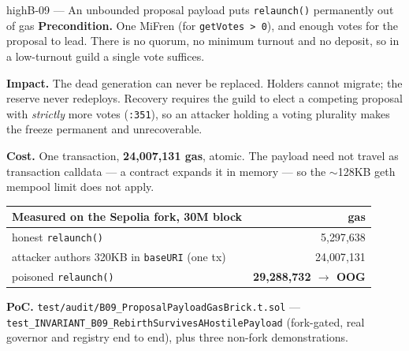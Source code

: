 \documentclass[11pt,a4paper]{article}
\newcommand{\code}[1]{\texttt{\small #1}}
\newcommand{\fileref}[1]{\texttt{\scriptsize #1}}
\begin{document}
\begin{findingbox}{high}{B-09 --- An unbounded proposal payload puts \code{relaunch()} permanently out of gas}
\textbf{Precondition.} One MiFren (for \code{getVotes > 0}), and enough votes for the
proposal to lead. There is no quorum, no minimum turnout and no deposit, so in a
low-turnout guild a single vote suffices.

\textbf{Impact.} The dead generation can never be replaced. Holders cannot migrate; the
reserve never redeploys. Recovery requires the guild to elect a competing proposal with
\emph{strictly} more votes (\fileref{:351}), so an attacker holding a voting plurality
makes the freeze permanent and unrecoverable.

\textbf{Cost.} One transaction, \textbf{24{,}007{,}131 gas}, atomic. The payload need not
travel as transaction calldata --- a contract expands it in memory --- so the $\sim$128KB
geth mempool limit does not apply.

\medskip
\begin{center}
\begin{tabular}{@{}lr@{}}
\toprule
\textbf{Measured on the Sepolia fork, 30M block} & \textbf{gas} \\
\midrule
honest \code{relaunch()} & 5{,}297{,}638 \\
attacker authors 320KB in \code{baseURI} (one tx) & 24{,}007{,}131 \\
poisoned \code{relaunch()} & \textcolor{critical}{\textbf{29{,}288{,}732 $\rightarrow$ OOG}} \\
\bottomrule
\end{tabular}
\end{center}

\textbf{PoC.} \fileref{test/audit/B09\_ProposalPayloadGasBrick.t.sol} ---
\code{test\_INVARIANT\_B09\_RebirthSurvivesAHostilePayload} (fork-gated, real governor and
registry end to end), plus three non-fork demonstrations.
\end{findingbox}
\end{document}
